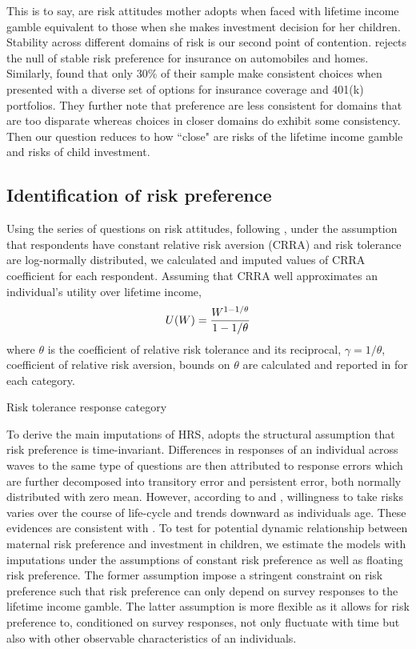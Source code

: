 \documentclass[]{article}
\begin{document}
\alert{This is to say, are risk attitudes mother adopts when faced with lifetime income gamble equivalent to those when she makes investment decision for her children. Stability across different domains of risk is our second point of contention. \citet{barseghyan2011risk} rejects the null of stable risk preference for insurance on automobiles and homes. Similarly, \citet{einav2012general} found that only 30\% of their sample make consistent choices when presented with a diverse set of options for insurance coverage and 401(k) portfolios. They further note that preference are less consistent for domains that are too disparate whereas choices in closer domains do exhibit some consistency. Then our question reduces to how ``close" are risks of the lifetime income gamble and risks of child investment.}


\subsection{Identification of risk preference}

Using the series of questions on risk attitudes, following \citet{kimball2008imputing,kimball2009risk}, under the assumption that respondents have constant relative risk aversion (CRRA) and risk tolerance are log-normally distributed, we calculated and imputed values of CRRA coefficient for each respondent. Assuming that CRRA well approximates an individual's utility over lifetime income,
\[U(W)={W^{1-{1/\theta}}\over 1-{1/\theta}}\]
where $\theta$ is the coefficient of relative risk tolerance and its reciprocal, $\gamma = 1/\theta$, coefficient of relative risk aversion, bounds on $\theta$ are calculated and reported in  for each category. 

\begin{table}[!t]
	\centering
	\setlength{\extrarowheight}{0.3em}
	\caption{Risk tolerance response category}	
	
	\label{table:2-risk-bound}
\end{table}

To derive the main imputations of HRS, \citet{kimball2008imputing} adopts the structural assumption that risk preference is time-invariant. Differences in responses of an individual across waves to the same type of questions are then attributed to response errors which are further decomposed into transitory error and persistent error, both normally distributed with zero mean. However, according to \citet{dohmen2011individual} and \citet{dohmen2017risk}, willingness to take risks varies over the course of life-cycle and trends downward as individuals age. These evidences are consistent with \citet{sahm2012much}. To test for potential dynamic relationship between maternal risk preference and investment in children, we estimate the models with imputations under the assumptions of constant risk preference as well as floating risk preference. The former assumption impose a stringent constraint on risk preference such that risk preference can only depend on survey responses to the lifetime income gamble. The latter assumption is more flexible as it allows for risk preference to, conditioned on survey responses, not only fluctuate with time but also with other observable characteristics of an individuals.  
\end{document}
